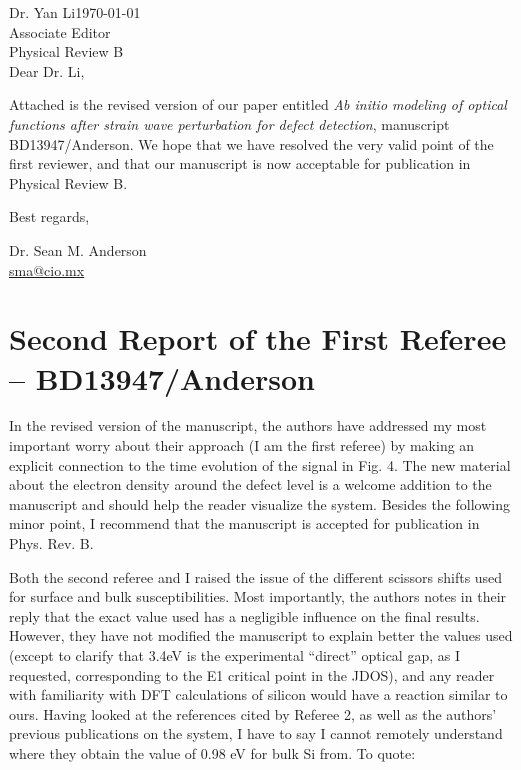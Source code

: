 \documentclass{article}
\begin{document}
\noindent Dr. Yan Li\hfill{\today}\\
Associate Editor\\
Physical Review B\\

\noindent Dear Dr. Li,

Attached is the revised version of our paper entitled \emph{Ab initio modeling
of optical functions after strain wave perturbation for defect detection},
manuscript BD13947/Anderson. We hope that we have resolved the very valid point
of the first reviewer, and that our manuscript is now acceptable for publication
in Physical Review B.

\noindent Best regards,

\noindent Dr. Sean M. Anderson\\
\href{mailto:sma@cio.mx}{sma@cio.mx}


\section{Second Report of the First Referee -- BD13947/Anderson}

In the revised version of the manuscript, the authors have addressed my most
important worry about their approach (I am the first referee) by making an
explicit connection to the time evolution of the signal in Fig. 4. The new
material about the electron density around the defect level is a welcome
addition to the manuscript and should help the reader visualize the system.
Besides the following minor point, I recommend that the manuscript is accepted
for publication in Phys. Rev. B.

Both the second referee and I raised the issue of the different scissors shifts
used for surface and bulk susceptibilities. Most importantly, the authors notes
in their reply that the exact value used has a negligible influence on the final
results. However, they have not modified the manuscript to explain better the
values used (except to clarify that 3.4eV is the experimental ``direct'' optical
gap, as I requested, corresponding to the E1 critical point in the JDOS), and
any reader with familiarity with DFT calculations of silicon would have a
reaction similar to ours. Having looked at the references cited by Referee 2, as
well as the authors' previous publications on the system, I have to say I cannot
remotely understand where they obtain the value of 0.98 eV for bulk Si from. To
quote:
\end{document}
